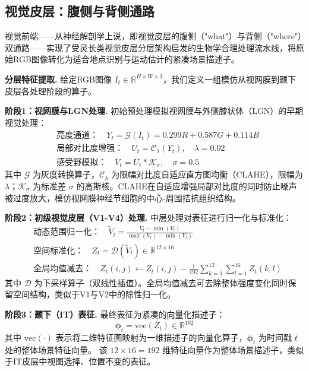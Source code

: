 \subsection{视觉皮层：腹侧与背侧通路}
\label{sec:visual_cortex}

视觉前端——从神经解剖学上说，即视觉皮层的腹侧（"what"）与背侧（"where"）双通路——实现了受灵长类视觉皮层分层架构启发的生物学合理处理流水线，将原始RGB图像转化为适合地点识别与运动估计的紧凑场景描述子。

\textbf{分层特征提取.} 给定RGB图像 $I_t\in\mathbb{R}^{H\times W\times 3}$，我们定义一组模仿从视网膜到颞下皮层各处理阶段的算子。

\textbf{阶段1：视网膜与LGN处理.} 初始预处理模拟视网膜与外侧膝状体（LGN）的早期视觉处理：
\begin{align}
     & \text{亮度通道：}\quad Y_t = \mathcal{G}(I_t) = 0.299R+0.587G+0.114B              \\
     & \text{局部对比度增强：}\quad U_t = \mathcal{C}_\lambda(Y_t),\quad \lambda=0.02 \\
     & \text{感受野模拟：}\quad V_t = U_t * \mathcal{K}_\sigma,\quad \sigma=0.5
\end{align}
其中 $\mathcal{G}$ 为灰度转换算子，$\mathcal{C}_\lambda$ 为限幅对比度自适应直方图均衡（CLAHE），限幅为 $\lambda$；$\mathcal{K}_\sigma$ 为标准差 $\sigma$ 的高斯核。CLAHE在自适应增强局部对比度的同时防止噪声被过度放大，模仿视网膜神经节细胞的中心-周围拮抗组织结构。

\textbf{阶段2：初级视觉皮层（V1-V4）处理.} 中层处理对表征进行归一化与标准化：
\begin{align}
     & \text{动态范围归一化：}\quad \tilde V_t = \frac{V_t-\min(V_t)}{\max(V_t)-\min(V_t)}     \\
     & \text{空间标准化：}\quad Z_t = \mathcal{D}(\tilde V_t)\in\mathbb{R}^{12\times16}        \\
     & \text{全局均值减去：}\quad Z_t(i,j)\leftarrow Z_t(i,j)-\frac{1}{192}\sum_{k=1}^{12}\sum_{l=1}^{16}Z_t(k,l)
\end{align}
其中 $\mathcal{D}$ 为下采样算子（双线性插值）。全局均值减去可去除整体强度变化同时保留空间结构，类似于V1与V2中的除性归一化。

\textbf{阶段3：颞下（IT）表征.} 最终表征为紧凑的向量化描述子：
\begin{equation}
    \boldsymbol{\phi}_t=\mathrm{vec}(Z_t)\in\mathbb{R}^{192}
\end{equation}
其中 $\mathrm{vec}(\cdot)$ 表示将二维特征图映射为一维描述子的向量化算子，$\boldsymbol{\phi}_t$ 为时间戳 $t$ 处的整体场景特征向量。
该 $12 \times 16 = 192$ 维特征向量作为整体场景描述子，类似于IT皮层中视图选择、位置不变的表征。

